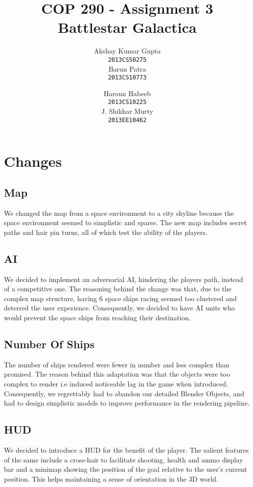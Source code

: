 \documentclass[]{article}
\newcommand{\ty}[1]{\texttt{#1}}
\begin{document}
\title{COP 290 - Assignment 3\\Battlestar Galactica}
\author{Akshay Kumar Gupta\\ \ty{2013CS50275} \\[.1in]  Barun Patra\\ \ty{2013CS10773} \and  Haroun Habeeb\\ \ty{2013CS10225} \\[.1in] J. Shikhar Murty\\ \ty{2013EE10462}}
\date{}
\maketitle
\section{Changes}
\subsection{Map}
We changed the map from a space environment to a city skyline because the space environment seemed to simplistic and sparse. The new map includes secret paths and hair pin turns, all of which test the ability of the players.
\subsection{AI}
We decided to implement an adversarial AI, hindering the players path, instead of a competitive one. The reasoning behind the change was that, due to the complex map structure, having 6 space ships racing seemed too clustered and deterred the user experience. Consequently, we decided to have AI units who would prevent the space ships from reaching their destination.
\subsection{Number Of Ships}
The number of ships rendered were fewer in number and less complex than promised. The reason behind this adaptation was that the objects were too complex to render i.e induced noticeable lag in the game when introduced. Consequently, we regrettably had to abandon our detailed Blender Objects, and had to design simplistic models to improve performance in the rendering pipeline. 
\subsection{HUD}
We decided to introduce a HUD for the benefit of the player. The salient features of the same include a cross-hair to facilitate shooting, health and ammo display bar and a minimap showing the position of the goal relative to the user's current position. This helps maintaining a sense of orientation in the 3D world.
\end{document}
